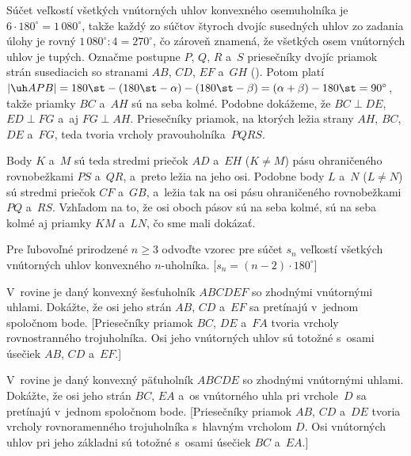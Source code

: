 {%
Súčet veľkostí všetkých vnútorných uhlov konvexného osemuholníka
je ${6\cdot 180^{\circ}}=1\,080^{\circ}$, takže každý zo súčtov štyroch
dvojíc susedných uhlov zo zadania úlohy je rovný $1\,080^{\circ}:4=270^{\circ}$,
čo zároveň znamená, že všetkých osem vnútorných uhlov je tupých.
Označme postupne $P$, $Q$, $R$ a~$S$ priesečníky dvojíc priamok strán susediacich
so stranami $AB$, $CD$, $EF$ a~$GH$ (\obr). Potom platí
$|\uh APB|=180\st-(180\st-\alpha)-(180\st-\beta)=(\alpha+\beta)-180\st=90^{\circ}$,
takže priamky $BC$ a~$AH$ sú na seba kolmé. Podobne dokážeme, že
$BC\perp DE$, ${ED\perp FG}$ a~aj $FG\perp AH$. Priesečníky priamok, na
ktorých ležia strany $AH$, $BC$, $DE$ a~$FG$, teda tvoria vrcholy pravouholníka~$PQRS$.
%

Body $K$ a~$M$ sú teda stredmi priečok $AD$ a~$EH$ ($K\ne M$)
pásu ohraničeného rovnobežkami $PS$ a~$QR$, a~preto ležia na jeho osi.
Podobne body $L$ a~$N$ ($L\ne N$) sú stredmi priečok $CF$ a~$GB$, a~ležia
tak na osi pásu ohraničeného rovnobežkami $PQ$ a~$RS$. Vzhľadom na to, že osi oboch
pásov sú na seba kolmé, sú na seba kolmé aj priamky $KM$ a~$LN$, čo
sme mali dokázať.

Pre ľubovoľné prirodzené $n\ge3$ odvoďte vzorec pre
súčet $s_n$ veľkostí všetkých vnútorných uhlov konvexného $n$-uholníka.
[$s_n=(n-2)\cdot 180^\circ$]

V~rovine je daný konvexný šesťuholník $ABCDEF$ so zhodnými
vnútornými uhlami. Dokážte, že osi jeho strán $AB$, $CD$ a~$EF$ sa
pretínajú v~jednom spoločnom bode.
[Priesečníky priamok $BC$, $DE$ a~$FA$ tvoria vrcholy
rovnostranného trojuholníka. Osi jeho vnútorných uhlov sú totožné
s~osami úsečiek $AB$, $CD$ a~$EF$.]

V~rovine je daný konvexný päťuholník $ABCDE$ so zhodnými
vnútornými uhlami. Dokážte, že osi jeho strán $BC$, $EA$ a~os vnútorného
uhla pri vrchole~$D$ sa pretínajú v~jednom spoločnom bode.
[Priesečníky priamok $AB$, $CD$ a~$DE$ tvoria vrcholy
rovnoramenného trojuholníka s~hlavným vrcholom $D$. Osi vnútorných uhlov
pri jeho základni sú totožné s~osami úsečiek $BC$ a~$EA$.]
}

